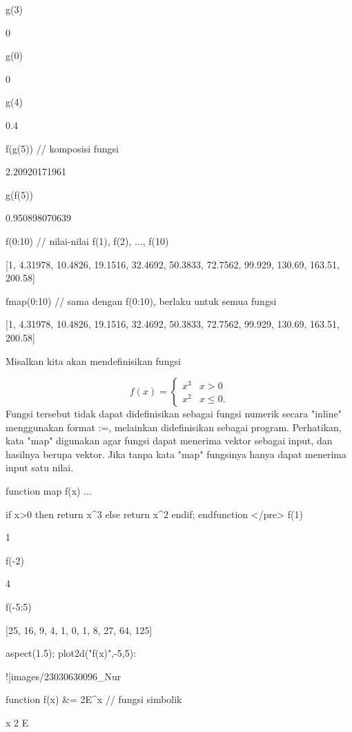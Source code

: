\documentclass{article}
\begin{document}
\>g(3)


    0

\>g(0)


    0

\>g(4)


    0.4

\>f(g(5)) // komposisi fungsi


    2.20920171961

\>g(f(5))


    0.950898070639

\>f(0:10) // nilai-nilai f(1), f(2), ..., f(10)


    [1,  4.31978,  10.4826,  19.1516,  32.4692,  50.3833,  72.7562,
    99.929,  130.69,  163.51,  200.58]

\>fmap(0:10) // sama dengan f(0:10), berlaku untuk semua fungsi


    [1,  4.31978,  10.4826,  19.1516,  32.4692,  50.3833,  72.7562,
    99.929,  130.69,  163.51,  200.58]

Misalkan kita akan mendefinisikan fungsi


$$f(x) = \begin{cases} x^3 & x>0 \\ x^2 & x\le 0. \end{cases}$$Fungsi tersebut tidak dapat didefinisikan sebagai fungsi numerik
secara "inline" menggunakan format :=, melainkan didefinisikan sebagai
program. Perhatikan, kata "map" digunakan agar fungsi dapat menerima
vektor sebagai input, dan hasilnya berupa vektor. Jika tanpa kata
"map" fungsinya hanya dapat menerima input satu nilai.


\>function map f(x) ...


      if x>0 then return x^3
      else return x^2
      endif;
    endfunction
</pre>
\>f(1)


    1

\>f(-2)


    4

\>f(-5:5)


    [25,  16,  9,  4,  1,  0,  1,  8,  27,  64,  125]

\>aspect(1.5); plot2d("f(x)",-5,5):


![images/23030630096_Nur%

\>function f(x) &= 2\*E^x // fungsi simbolik


    
                                        x
                                     2 E
    
\end{document}
